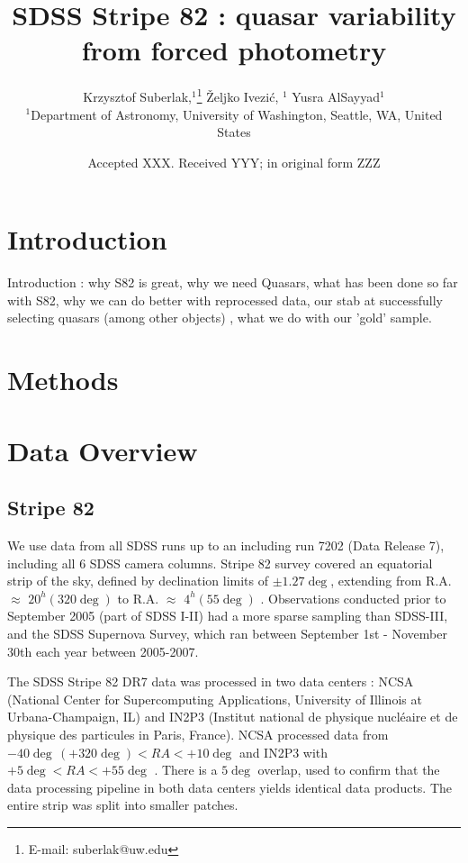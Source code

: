 \documentclass[fleqn,usenatbib]{mnras}  %
\title[SDSS Quasars]{SDSS Stripe 82 : quasar variability from forced photometry}
\author[K. Suberlak et al.]{
Krzysztof Suberlak,$^{1}$\thanks{E-mail: suberlak@uw.edu}
\v{Z}eljko Ivezi\'c, $^{1}$
Yusra AlSayyad$^{1}$ 
\\
$^{1}$Department of Astronomy, University of Washington, Seattle, WA, United States\\
}
\date{Accepted XXX. Received YYY; in original form ZZZ}
\begin{document}
\label{firstpage}
\pagerange{\pageref{firstpage}--\pageref{lastpage}}
\maketitle

\begin{abstract}

\end{abstract}




\section{Introduction}
\label{sec:intro}

Introduction : why S82 is great,  why we need Quasars,  what has been done so far with S82, why we can do better with reprocessed data,  our stab at  successfully selecting quasars (among other objects) , what we do with our 'gold' sample.  

\section{Methods}


\section{Data Overview}
\label{sec:data}

\subsection{Stripe 82}
We use data from all SDSS runs up to an including run 7202 (Data Release 7), including all 6 SDSS camera columns. Stripe 82 survey covered an equatorial strip of the sky, defined by declination limits of $\pm1.27\deg$, extending from R.A. $\approx$ $20^{h} (320 \deg)$ to R.A.  $\approx$ $4^{h} (55 \deg)$ \citep{sesar2007,sesar2010}. Observations conducted prior to September 2005 (part of SDSS I-II) had a more sparse sampling than SDSS-III, and the SDSS Supernova Survey, which ran between September 1st - November 30th each year between 2005-2007. 

The SDSS Stripe 82 DR7  data  was processed in two data centers : NCSA (National Center for Supercomputing Applications, University of Illinois at Urbana-Champaign, IL) and IN2P3  (Institut national de physique nucl\'eaire et de physique des particules in Paris, France). NCSA processed data from $-40 \deg \, (+320 \deg) < RA < +10 \deg $ and IN2P3 with $ +5 \deg < RA < +55 \deg$ . There is a $5 \deg$ overlap, used to confirm that the data processing pipeline in both data centers yields identical data products. The entire strip was split into smaller patches.
\end{document}
